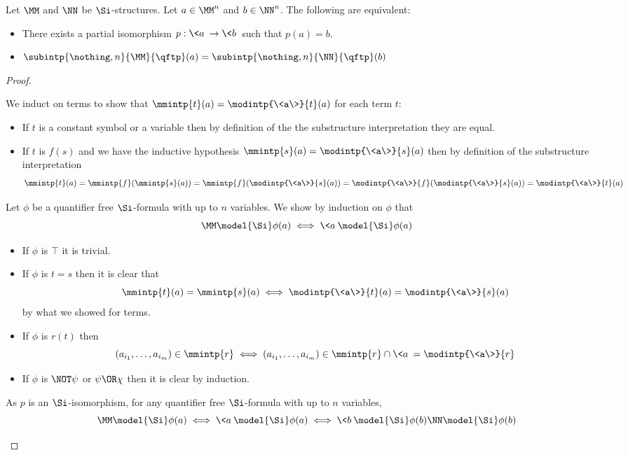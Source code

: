\begin{prop}
    Let $\MM$ and $\NN$ be $\Si$-structures. 
    Let $a \in \MM^n$ and $b \in \NN^n$.
    The following are equivalent:
    \begin{itemize}
        \item There exists a partial isomorphism $p : \<a\> \to \<b\>$ 
            such that $p(a) = b$.
        \item $\subintp{\nothing,n}{\MM}{\qftp}(a) = 
            \subintp{\nothing,n}{\NN}{\qftp}(b)$
    \end{itemize}
\end{prop}
\begin{proof}
    \begin{forward}
        We induct on terms to show that $\mmintp{t}(a) = \modintp{\<a\>}{t}(a)$
        for each term $t$:
        \begin{itemize}
            \item If $t$ is a constant symbol or a variable 
                then by definition of the 
                the substructure interpretation they are equal.
            \item If $t$ is $f(s)$ and we have the inductive hypothesis 
                $\mmintp{s}(a) = \modintp{\<a\>}{s}(a)$
                then by definition of the substructure interpretation
                \[
                    \mmintp{t}(a) = \mmintp{f}(\mmintp{s}(a))
                    = \mmintp{f}(\modintp{\<a\>}{s}(a))
                    = \modintp{\<a\>}{f}(\modintp{\<a\>}{s}(a))
                    = \modintp{\<a\>}{t}(a)
                \]
        \end{itemize}
    
    Let $\phi$ be a quantifier free $\Si$-formula with up to $n$ variables.
    We show by induction on $\phi$ that 
    \[
        \MM \model{\Si} \phi(a)
        \iff \<a\> \model{\Si} \phi(a)
    \]
    \begin{itemize}
        \item If $\phi$ is $\top$ it is trivial.
        \item If $\phi$ is $t = s$ then it is clear that
            \[
                \mmintp{t}(a) = \mmintp{s}(a)
                \iff \modintp{\<a\>}{t}(a) = \modintp{\<a\>}{s}(a)
            \]
            by what we showed for terms.
        \item If $\phi$ is $r(t)$ then 
            \[  
                (a_{i_1},\dots, a_{i_m}) \in \mmintp{r}
                \iff (a_{i_1},\dots, a_{i_m}) \in 
                \mmintp{r} \cap \<a\> = \modintp{\<a\>}{r}
            \]
        \item If $\phi$ is $\NOT \psi$ or $\psi \OR \chi$ then it is 
            clear by induction.
    \end{itemize}
    As $p$ is an $\Si$-isomorphism, for any quantifier free $\Si$-formula
    with up to $n$ variables,
    \[\MM \model{\Si} \phi(a) \iff \<a\> \model{\Si} \phi(a)
    \iff \<b\> \model{\Si} \phi(b)
    \NN \model{\Si} \phi(b)\]
    \end{forward}


\end{proof}
